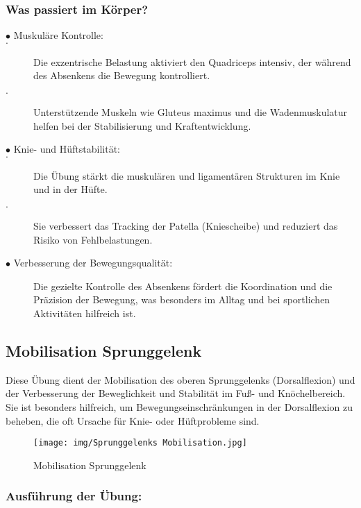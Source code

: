 \subsubsection{Was passiert im Körper?}

\begin{description}
    \item[$\bullet$ Muskuläre Kontrolle:]

    \item[$\cdot$] Die exzentrische Belastung aktiviert den Quadriceps intensiv, der während des Absenkens die Bewegung kontrolliert.
    \item[$\cdot$] Unterstützende Muskeln wie Gluteus maximus und die Wadenmuskulatur helfen bei der Stabilisierung und Kraftentwicklung.

    \item[$\bullet$ Knie- und Hüftstabilität:]
        \item[$\cdot$]Die Übung stärkt die muskulären und ligamentären Strukturen im Knie und in der Hüfte.
        \item[$\cdot$]Sie verbessert das Tracking der Patella (Kniescheibe) und reduziert das Risiko von Fehlbelastungen.
    \item[$\bullet$ Verbesserung der Bewegungsqualität:] Die gezielte Kontrolle des Absenkens fördert die Koordination und die Präzision der Bewegung, was besonders im Alltag und bei sportlichen Aktivitäten hilfreich ist.

\end{description}

\subsection{Mobilisation Sprunggelenk}

Diese Übung dient der Mobilisation des oberen Sprunggelenks (Dorsalflexion) und der Verbesserung der Beweglichkeit und Stabilität im Fuß- und Knöchelbereich. Sie ist besonders hilfreich, um Bewegungseinschränkungen in der Dorsalflexion zu beheben, die oft Ursache für Knie- oder Hüftprobleme sind.

\begin{figure}
    \centering
    \texttt{[image: img/Sprunggelenks Mobilisation.jpg]}
    \caption{Mobilisation Sprunggelenk \cite{valife}}
    \label{Mobilisation Sprunggelenk}
\end{figure}


\subsubsection{Ausführung der Übung:}

